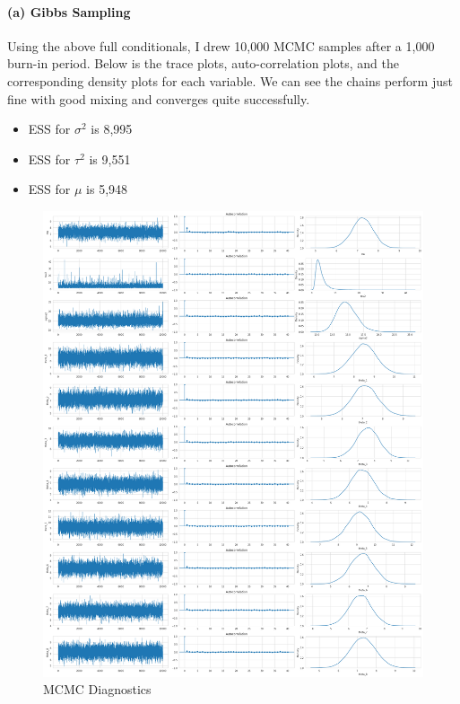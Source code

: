\documentclass[11pt, letterpaper]{article}
\begin{document}
\paragraph{(a) Gibbs Sampling}
Using the above full conditionals, I drew 10,000 MCMC samples after a 1,000 burn-in period. Below is the trace plots, auto-correlation plots, and the corresponding density plots for each variable. We can see the chains perform just fine with good mixing and converges quite successfully.
\begin{itemize}
    \item ESS for $\sigma^2$ is 8,995
    \item ESS for $\tau^2$ is 9,551
    \item ESS for $\mu$ is 5,948
\end{itemize}
\begin{figure}[!h]
  \centering
  \includegraphics[width=1.0\textwidth]{3.a.png}
  \captionsetup{justification=centering}
  \caption{MCMC Diagnostics}
\end{figure}

\newpage
\end{document}
